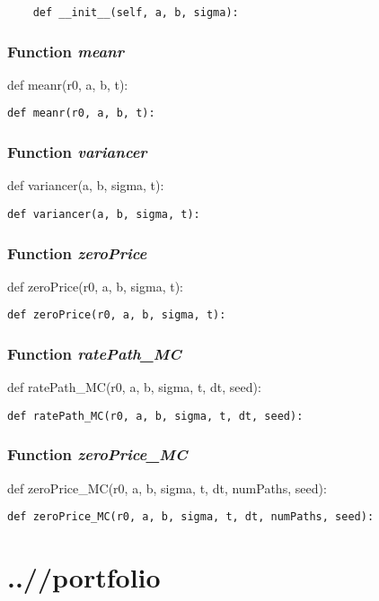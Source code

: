 \documentclass[twoside,11pt]{book}
\begin{document}
\begin{lstlisting}
    def __init__(self, a, b, sigma):
\end{lstlisting}

\subsection{Function {\it meanr}}
def meanr(r0, a, b, t):

\begin{lstlisting}
def meanr(r0, a, b, t):
\end{lstlisting}

\subsection{Function {\it variancer}}
def variancer(a, b, sigma, t):

\begin{lstlisting}
def variancer(a, b, sigma, t):
\end{lstlisting}

\subsection{Function {\it zeroPrice}}
def zeroPrice(r0, a, b, sigma, t):

\begin{lstlisting}
def zeroPrice(r0, a, b, sigma, t):
\end{lstlisting}

\subsection{Function {\it ratePath\_MC}}
def ratePath\_MC(r0, a, b, sigma, t, dt, seed):

\begin{lstlisting}
def ratePath_MC(r0, a, b, sigma, t, dt, seed):
\end{lstlisting}

\subsection{Function {\it zeroPrice\_MC}}
def zeroPrice\_MC(r0, a, b, sigma, t, dt, numPaths, seed):

\begin{lstlisting}
def zeroPrice_MC(r0, a, b, sigma, t, dt, numPaths, seed):
\end{lstlisting}


\chapter{..//portfolio}
\end{document}
